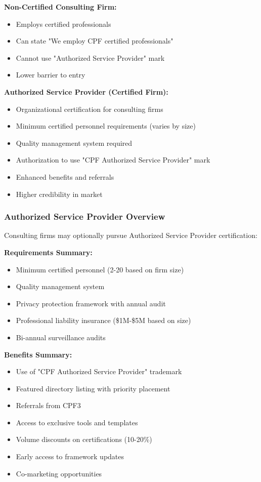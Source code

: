 \documentclass[11pt,a4paper]{article}
\begin{document}
\textbf{Non-Certified Consulting Firm:}
\begin{itemize}
\item Employs certified professionals
\item Can state "We employ CPF certified professionals"
\item Cannot use "Authorized Service Provider" mark
\item Lower barrier to entry
\end{itemize}

\textbf{Authorized Service Provider (Certified Firm):}
\begin{itemize}
\item Organizational certification for consulting firms
\item Minimum certified personnel requirements (varies by size)
\item Quality management system required
\item Authorization to use "CPF Authorized Service Provider" mark
\item Enhanced benefits and referrals
\item Higher credibility in market
\end{itemize}

\subsubsection{Authorized Service Provider Overview}

Consulting firms may optionally pursue Authorized Service Provider certification:

\textbf{Requirements Summary:}
\begin{itemize}
\item Minimum certified personnel (2-20 based on firm size)
\item Quality management system
\item Privacy protection framework with annual audit
\item Professional liability insurance (\$1M-\$5M based on size)
\item Bi-annual surveillance audits
\end{itemize}

\textbf{Benefits Summary:}
\begin{itemize}
\item Use of "CPF Authorized Service Provider" trademark
\item Featured directory listing with priority placement
\item Referrals from CPF3
\item Access to exclusive tools and templates
\item Volume discounts on certifications (10-20\%)
\item Early access to framework updates
\item Co-marketing opportunities
\end{itemize}
\end{document}
